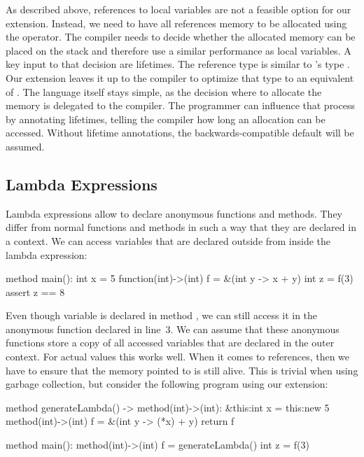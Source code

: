 As described above, references to local variables are not a feasible option for our extension.
Instead, we need to have all references memory to be allocated using the  operator.
The compiler needs to decide whether the allocated memory can be placed on the stack and therefore use a similar performance as local variables.
A key input to that decision are lifetimes.
The \whiley reference type  is similar to \rust's type .
Our extension leaves it up to the compiler to optimize that type to an equivalent of .
The \whiley language itself stays simple, as the decision where to allocate the memory is delegated to the compiler.
The programmer can influence that process by annotating lifetimes, telling the compiler how long an allocation can be accessed.
Without lifetime annotations, the backwards-compatible default will be assumed.


\subsection{Lambda Expressions}\label{section:design-discussion-lambda}
Lambda expressions allow to declare anonymous functions and methods.
They differ from normal functions and methods in such a way that they are declared in a context.
We can access variables that are declared outside from inside the lambda expression:

\begin{whileycode}
method main():
	int x = 5
	function(int)->(int) f = &(int y -> x + y)
	int z = f(3)
	assert z == 8
\end{whileycode}

Even though variable  is declared in method , we can still access it in the anonymous function declared in line~3.
We can assume that these anonymous functions store a copy of all accessed variables that are declared in the outer context.
For actual values this works well.
When it comes to references, then we have to ensure that the memory pointed to is still alive.
This is trivial when using garbage collection, but consider the following program using our extension:

\begin{whileycode}
method generateLambda() -> method(int)->(int):
	&this:int x = this:new 5
	method(int)->(int) f = &(int y -> (*x) + y)
	return f

method main():
	method(int)->(int) f = generateLambda()
	int z = f(3)
\end{whileycode}

